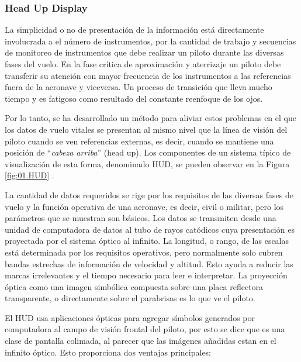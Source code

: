   
\subsubsection{Head Up Display }
\label{sec:HUD}
  
La simplicidad o no de presentaci\'on de la informaci\'on est\'a directamente involucrada a el número de instrumentos, por la cantidad de trabajo y secuencias de monitoreo de instrumentos que debe realizar un piloto durante las diversas fases del vuelo. En la fase crítica de aproximación y aterrizaje un piloto debe transferir su atención con mayor frecuencia de los instrumentos a las referencias fuera de la aeronave y viceversa. Un proceso de transición que lleva mucho tiempo y es fatigoso como resultado del constante reenfoque de los ojos.

Por lo tanto, se ha desarrollado un método para aliviar estos problemas en el que los datos de vuelo vitales se presentan al mismo nivel que la línea de visión del piloto cuando se ven referencias externas, es decir, cuando se mantiene una posición de ``{\it cabeza arriba}'' (head up). Los componentes de un sistema típico de visualización de esta forma, denominado \ac{HUD}, se pueden observar en la Figura \ref{fig:01.HUD} \cite{MikesFlightDeck}.

La cantidad de datos requeridos se rige por los requisitos de las diversas fases de vuelo y la función operativa de una aeronave, es decir, civil o militar, pero los  parámetros que se muestran son básicos. Los datos se transmiten desde una unidad de computadora de datos al tubo de rayos catódicos  cuya presentación es proyectada por el sistema óptico al infinito. La longitud, o rango, de las escalas está determinada por los requisitos operativos, pero normalmente solo cubren bandas estrechas de información de velocidad y altitud. Esto ayuda a reducir las marcas irrelevantes y el tiempo necesario para leer e interpretar. La  proyecci\'on óptica como una imagen simbólica compuesta sobre una placa reflectora transparente, o directamente sobre el parabrisas es lo que ve el piloto. %

El HUD usa aplicaciones ópticas para agregar símbolos generados por computadora al campo de visión frontal del piloto, por esto se dice que es una clase de pantalla colimada, al parecer que las imágenes añadidas estan en el infinito óptico. Esto proporciona dos ventajas principales:

